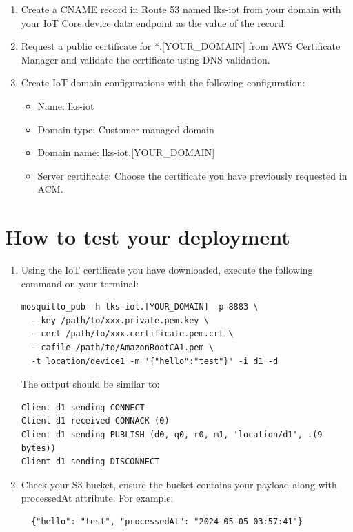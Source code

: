 \documentclass{article}
\begin{document}
\begin{enumerate}
\begin{itemize}
  \end{itemize}
\item Create a CNAME record in Route 53 named lks-iot from your domain with your IoT Core device data endpoint as the value of the record.
\item Request a public certificate for *.[YOUR\_DOMAIN] from AWS Certificate Manager and validate the certificate using DNS validation.
\item Create IoT domain configurations with the following configuration:
  \begin{itemize}
    \item Name: lks-iot
    \item Domain type: Customer managed domain
    \item Domain name: lks-iot.[YOUR\_DOMAIN]
    \item Server certificate: Choose the certificate you have previously requested in ACM.
  \end{itemize}
\end{enumerate}
\section{How to test your deployment}
\begin{enumerate}
  \item Using the IoT certificate you have downloaded, execute the following command on your terminal:
    \begin{lstlisting}
mosquitto_pub -h lks-iot.[YOUR_DOMAIN] -p 8883 \
  --key /path/to/xxx.private.pem.key \
  --cert /path/to/xxx.certificate.pem.crt \
  --cafile /path/to/AmazonRootCA1.pem \
  -t location/device1 -m '{"hello":"test"}' -i d1 -d
    \end{lstlisting}
    The output should be similar to:
    \begin{lstlisting}
Client d1 sending CONNECT
Client d1 received CONNACK (0)
Client d1 sending PUBLISH (d0, q0, r0, m1, 'location/d1', .(9 bytes))
Client d1 sending DISCONNECT
    \end{lstlisting}
  \item Check your S3 bucket, ensure the bucket contains your payload along with processedAt attribute.
  For example:
  \begin{lstlisting}
  {"hello": "test", "processedAt": "2024-05-05 03:57:41"}
  \end{lstlisting}
\end{enumerate}
\end{document}
